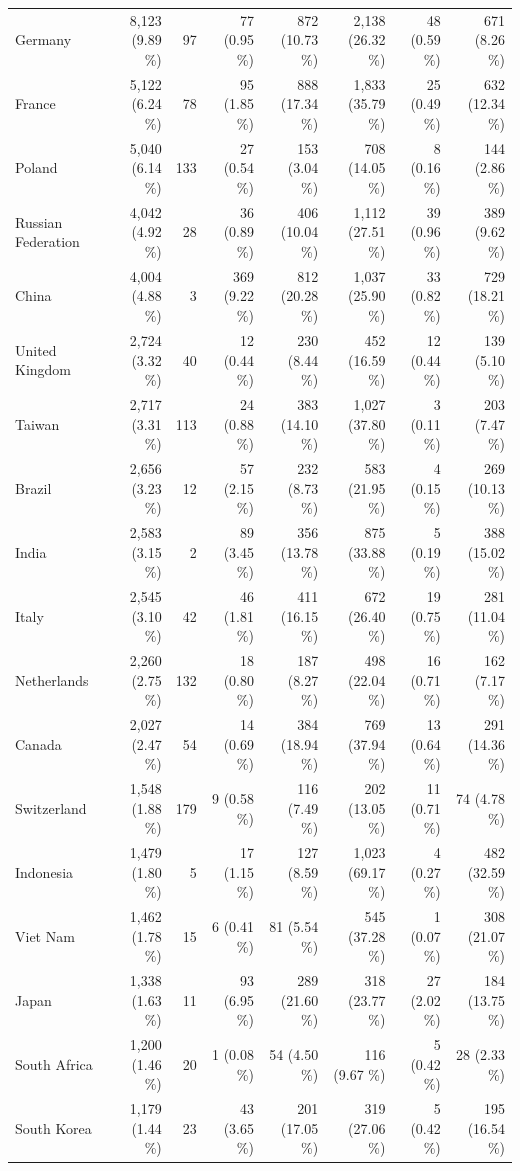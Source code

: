 \begin{table}[tb]
\begin{tabular}{@{} l r r r r rrr @{}}
Germany&8,123 (9.89 \%) & 97 & 77 (0.95 \%) & 872 (10.73 \%) & 2,138 (26.32 \%) & 48 (0.59 \%) & 671 (8.26 \%)\\
France&5,122 (6.24 \%) & 78 & 95 (1.85 \%) & 888 (17.34 \%) & 1,833 (35.79 \%) & 25 (0.49 \%) & 632 (12.34 \%)\\
Poland&5,040 (6.14 \%) & 133 & 27 (0.54 \%) & 153 (3.04 \%) & 708 (14.05 \%) & 8 (0.16 \%) & 144 (2.86 \%)\\
Russian Federation&4,042 (4.92 \%) & 28 & 36 (0.89 \%) & 406 (10.04 \%) & 1,112 (27.51 \%) & 39 (0.96 \%) & 389 (9.62 \%)\\
China&4,004 (4.88 \%) & 3 & 369 (9.22 \%) & 812 (20.28 \%) & 1,037 (25.90 \%) & 33 (0.82 \%) & 729 (18.21 \%)\\
United Kingdom&2,724 (3.32 \%) & 40 & 12 (0.44 \%) & 230 (8.44 \%) & 452 (16.59 \%) & 12 (0.44 \%) & 139 (5.10 \%)\\
Taiwan &2,717 (3.31 \%) & 113 & 24 (0.88 \%) & 383 (14.10 \%) & 1,027 (37.80 \%) & 3 (0.11 \%) & 203 (7.47 \%)\\
Brazil&2,656 (3.23 \%) & 12 & 57 (2.15 \%) & 232 (8.73 \%) & 583 (21.95 \%) & 4 (0.15 \%) & 269 (10.13 \%)\\
India&2,583 (3.15 \%) & 2 & 89 (3.45 \%) & 356 (13.78 \%) & 875 (33.88 \%) & 5 (0.19 \%) & 388 (15.02 \%)\\
Italy&2,545 (3.10 \%) & 42 & 46 (1.81 \%) & 411 (16.15 \%) & 672 (26.40 \%) & 19 (0.75 \%) & 281 (11.04 \%)\\
Netherlands&2,260 (2.75 \%) & 132 & 18 (0.80 \%) & 187 (8.27 \%) & 498 (22.04 \%) & 16 (0.71 \%) & 162 (7.17 \%)\\
Canada&2,027 (2.47 \%) & 54 & 14 (0.69 \%) & 384 (18.94 \%) & 769 (37.94 \%) & 13 (0.64 \%) & 291 (14.36 \%)\\
Switzerland&1,548 (1.88 \%) & 179 & 9 (0.58 \%) & 116 (7.49 \%) & 202 (13.05 \%) & 11 (0.71 \%) & 74 (4.78 \%)\\
Indonesia&1,479 (1.80 \%) & 5 & 17 (1.15 \%) & 127 (8.59 \%) & 1,023 (69.17 \%) & 4 (0.27 \%) & 482 (32.59 \%)\\
Viet Nam&1,462 (1.78 \%) & 15 & 6 (0.41 \%) & 81 (5.54 \%) & 545 (37.28 \%) & 1 (0.07 \%) & 308 (21.07 \%)\\
Japan&1,338 (1.63 \%) & 11 & 93 (6.95 \%) & 289 (21.60 \%) & 318 (23.77 \%) & 27 (2.02 \%) & 184 (13.75 \%)\\
South Africa&1,200 (1.46 \%) & 20 & 1 (0.08 \%) & 54 (4.50 \%) & 116 (9.67 \%) & 5 (0.42 \%) & 28 (2.33 \%)\\
South Korea &1,179 (1.44 \%) & 23 & 43 (3.65 \%) & 201 (17.05 \%) & 319 (27.06 \%) & 5 (0.42 \%) & 195 (16.54 \%)\\

\end{tabular}
\end{table}
